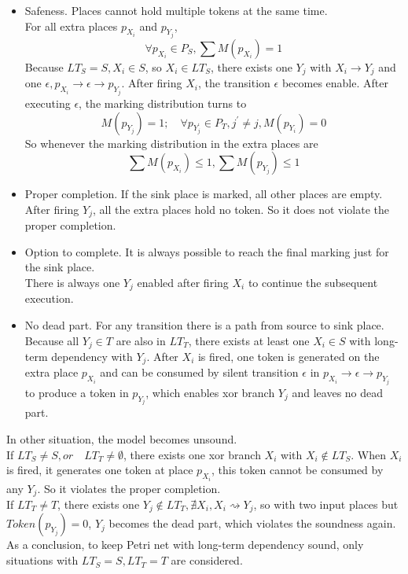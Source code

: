 \begin{itemize}
	\item Safeness. Places cannot hold multiple tokens at the same time.\\
	For all extra places $p_{X_i}$ and $p_{Y_j}$, 
	\[\forall p_{X_i} \in P_S, \sum M(p_{X_i})=1\]
	Because $ LT_S = S, X_i \in S$, so $X_i \in LT_S$, there exists one $Y_j$ with $X_i \rightarrow Y_j$ and one $\epsilon, p_{X_i} \rightarrow \epsilon
	\rightarrow p_{Y_{j}} $.  After firing $X_i$, the transition $\epsilon$ becomes enable. After executing $\epsilon$, the marking distribution turns to 
	\[ M(p_{Y_j}) = 1;\quad 
	\forall p_{Y_j^\prime} \in P_T, j^\prime \neq j,  M(p_{Y_i})=0 \]
	So whenever the marking distribution in the extra places are
	\[\sum M(p_{X_i}) \leq 1,  \sum M(p_{Y_j}) \leq 1 \] 
	\item Proper completion. If the sink place is marked, all other places are empty. \\
	After firing $Y_j$, all the extra places hold no token. So it does not violate the proper completion.
	\item Option to complete.  It is always possible to reach the final marking just for the sink place. \\
	There is always one $Y_j$ enabled after firing $X_i$ to continue the subsequent execution.
	\item No dead part. For any transition there is a path from source to sink place. \\
	Because all $Y_j \in T$ are also in $LT_T$, there exists at least one $X_i\in S$ with long-term dependency with $Y_j$. After $X_i$ is fired, one token is generated on the extra place $p_{X_i}$ and can be consumed by silent transition $\epsilon$ in  $p_{X_i} \rightarrow \epsilon \rightarrow p_{Y_{j}}$ to produce a token in $p_{Y_j}$, which enables xor branch $Y_j$ and leaves no dead part.
\end{itemize}
In other situation, the model becomes unsound. \\
\indent If $LT_S \neq S,or\quad LT_T \neq \emptyset$, there exists one xor branch $X_i$ with $X_i \notin LT_S$. When $X_i$ is fired, it generates one token at place $p_{X_i}$, this token cannot be consumed by any $Y_j$. So it violates the proper completion. \\  
\indent If $LT_T \neq T$, there exists one $Y_j \notin LT_T, \nexists X_i, X_i \rightsquigarrow Y_j$, so with two input places but $Token(p_{Y_j})=0$,  $Y_j$ becomes the dead part, which violates the soundness again. 
As a conclusion, to keep Petri net with long-term dependency sound, only situations with $ LT_S = S, LT_T=T$ are considered.  
